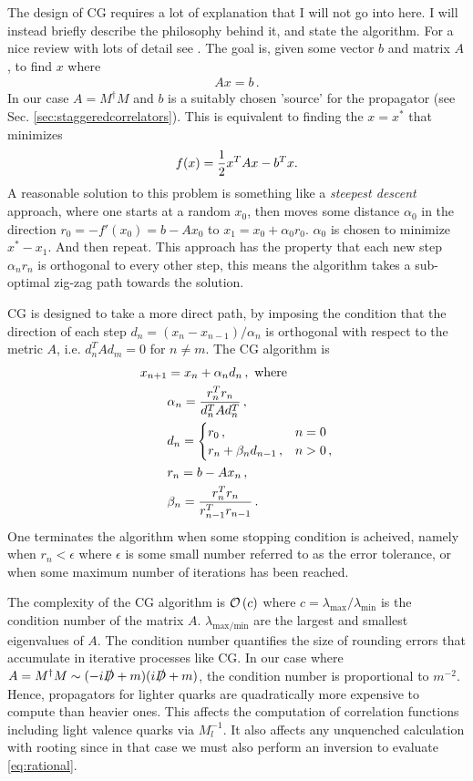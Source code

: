 The design of CG requires a lot of explanation that I will not go into here. I will instead briefly describe the philosophy behind it, and state the algorithm. For a nice review with lots of detail see \cite{Shewchuk94anintroduction}. The goal is, given some vector $b$ and matrix $A$, to find $x$ where
\begin{align}
  Ax = b\,.
\end{align}
In our case $A=M^{\dagger}M$ and $b$ is a suitably chosen 'source' for the propagator (see Sec. \ref{sec:staggeredcorrelators}). This is equivalent to finding the $x=x^*$ that minimizes
\begin{align}
  f(x) = {1\over2}x^TAx - b^Tx.
\end{align}
A reasonable solution to this problem is something like a {\it{steepest descent}} approach, where one starts at a random $x_0$, then moves some distance $\alpha_0$ in the direction $r_0 = -f'(x_0) = b-Ax_0$ to $x_1=x_0+\alpha_0 r_0$. $\alpha_0$ is chosen to minimize $x^*-x_1$. And then repeat. This approach has the property that each new step $\alpha_n r_n$ is orthogonal to every other step, this means the algorithm takes a sub-optimal zig-zag path towards the solution.

CG is designed to take a more direct path, by imposing the condition that the direction of each step $d_n=(x_n-x_{n-1})/\alpha_n$ is orthogonal with respect to the metric $A$, i.e. $d^T_n A d_m = 0$ for $n\neq m$. The CG algorithm is
\begin{align}
  \nonumber
  x_{n+1} &= x_n + \alpha_n d_n\,, \text{ where } \\
  \nonumber
  &\alpha_n = {r^T_n r_n \over d^T_n A d_n^T}\,, \\
  \nonumber
  &d_n=
  \begin{cases}
    r_0\,, &  n=0 \\
    r_{n} + \beta_n d_{n-1}\,, & n>0\,,
  \end{cases} \\
  \nonumber
  &r_n = b - Ax_n\,, \\
  &\beta_n = {r^T_n r_n \over r^T_{n-1}r_{n-1}}\,.
  \label{eq:CG}
\end{align}
One terminates the algorithm when some stopping condition is acheived, namely when $r_n < \epsilon$ where $\epsilon$ is some small number referred to as the error tolerance, or when some maximum number of iterations has been reached.

The complexity of the CG algorithm is $\mathcal{O}\left( c \right)$ where $c=\lambda_{\text{max}}/\lambda_{\text{min}}$ is the condition number of the matrix $A$. $\lambda_{\text{max/min}}$ are the largest and smallest eigenvalues of $A$. The condition number quantifies the size of rounding errors that accumulate in iterative processes like CG. In our case where $A=M^{\dagger}M  \sim(-i\slashed{D}+m)(i\slashed{D}+m)$, the condition number is proportional to $m^{-2}$. Hence, propagators for lighter quarks are quadratically more expensive to compute than heavier ones. This affects the computation of correlation functions including light valence quarks via $M_l^{-1}$. It also affects any unquenched calculation with rooting since in that case we must also perform an inversion to evaluate \eqref{eq:rational}.

